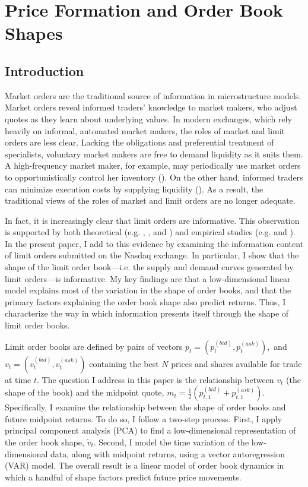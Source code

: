 \chapter{Price Formation and Order Book Shapes}
\label{chapter:three}

\section{Introduction}
	Market orders are the traditional source of information in microstructure models. Market orders reveal informed traders' knowledge to market makers, who adjust quotes as they learn about underlying values. In modern exchanges, which rely heavily on informal, automated market makers, the roles of market and limit orders are less clear. Lacking the obligations and preferential treatment of specialists, voluntary market makers are free to demand liquidity as it suits them. A high-frequency market maker, for example, may periodically use market orders to opportunistically control her inventory (\citet{Xu2015}). On the other hand, informed traders can minimize execution costs by supplying liquidity (\citet{Cont2017}). As a result, the traditional views of the roles of market and limit orders are no longer adequate.

	In fact, it is increasingly clear that limit orders are informative. This observation is supported by both theoretical (e.g. \citet{Kaniel2006}, \citet{Goettler2009}, and \cite{Rosu2009}) and empirical studies (e.g. \citet{Cao2009} and \citet{Brogaard2015}). In the present paper, I add to this evidence by examining the information content of limit orders submitted on the Nasdaq exchange. In particular, I show that the shape of the limit order book---i.e. the supply and demand curves generated by limit orders---is informative. My key findings are that a low-dimensional linear model explains most of the variation in the shape of order books, and that the primary factors explaining the order book shape also predict returns. Thus, I characterize the way in which information presents itself through the shape of limit order books.

	Limit order books are defined by pairs of vectors $p_t = (p_t^{(bid)}, p_t^{(ask)}),$ and $v_t = (v_t^{(bid)}, v_t^{(ask)})$ containing the best $N$ prices and shares available for trade at time $t$. The question I address in this paper is the relationship between $v_t$ (the shape of the book) and the midpoint quote, $m_t = \frac{1}{2} \left( p_{t,1}^{(bid)} + p_{t,1}^{(ask)} \right)$. Specifically, I examine the relationship between the shape of order books and future midpoint returns. To do so, I follow a two-step process. First, I apply principal component analysis (PCA) to find a low-dimensional representation of the order book shape, $\tilde{v}_t$. Second, I model the time variation of the low-dimensional data, along with midpoint returns, using a vector autoregression (VAR) model. The overall result is a linear model of order book dynamics in which a handful of shape factors predict future price movements.

